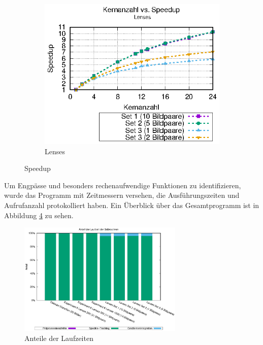 \begin{center}
\begin{figure}[htbp]
\begin{subfigure}[b]{0.325\textwidth}
			\label{fig:speedup_exp6}
		\end{subfigure}
		\hfill
		\begin{subfigure}[b]{0.325\textwidth}
			\centering
			\includegraphics[width=\textwidth]{pdf/speedup_lenses}
			\caption[Lenses]{Lenses}
			\label{fig:speedup_lenses}
		\end{subfigure}
		\caption{Speedup}
		\label{fig:speedup}
	\end{figure}
\end{center}

Um Engpässe und besonders rechenaufwendige Funktionen zu identifizieren, wurde das Programm mit Zeitmessern versehen, die Ausführungszeiten und Aufrufanzahl protokolliert haben. Ein Überblick über das Gesamtprogramm ist in Abbildung \ref{fig:perc_main} zu sehen.

\begin{center}
	\begin{figure}[htbp]
		\centering
		\includegraphics[width=0.7\textwidth]{pdf/main}
		\caption{Anteile der Laufzeiten}
		\label{fig:perc_main}
	\end{figure}
\end{center}

